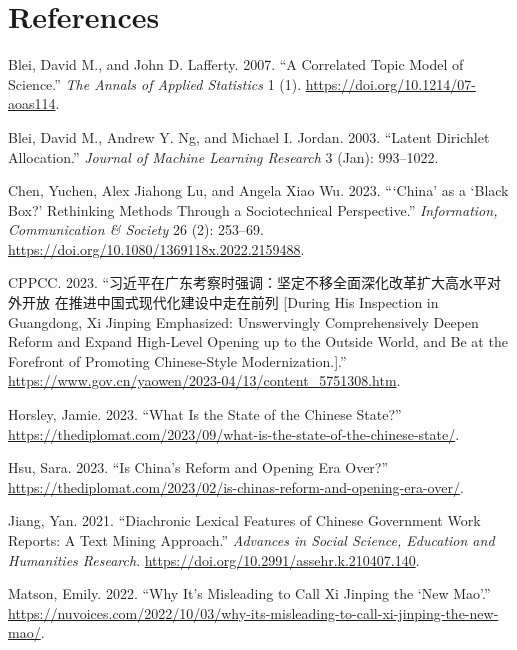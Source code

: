 \documentclass[
  letterpaper,
  abstract=true]{scrartcl}
\newlength{\cslhangindent}
\newenvironment{CSLReferences}[2] %
 {\begin{list}{}{%
  \setlength{\itemindent}{0pt}
  \setlength{\leftmargin}{0pt}
  \setlength{\parsep}{0pt}
  \ifodd #1
   \setlength{\leftmargin}{\cslhangindent}
   \setlength{\itemindent}{-1\cslhangindent}
  \fi
  \setlength{\itemsep}{#2\baselineskip}}}
 {\end{list}}
\begin{document}
\section*{References}\label{references}

\label{refs}
\begin{CSLReferences}{1}{0}
Blei, David M., and John D. Lafferty. 2007. {``A Correlated Topic Model
of Science.''} \emph{The Annals of Applied Statistics} 1 (1).
\url{https://doi.org/10.1214/07-aoas114}.

Blei, David M., Andrew Y. Ng, and Michael I. Jordan. 2003. {``Latent
Dirichlet Allocation.''} \emph{Journal of Machine Learning Research} 3
(Jan): 993--1022.

Chen, Yuchen, Alex Jiahong Lu, and Angela Xiao Wu. 2023. {``{`}China{'}
as a {`}Black Box?{'} Rethinking Methods Through a Sociotechnical
Perspective.''} \emph{Information, Communication \& Society} 26 (2):
253--69. \url{https://doi.org/10.1080/1369118x.2022.2159488}.

CPPCC. 2023.
{``习近平在广东考察时强调：坚定不移全面深化改革扩大高水平对外开放
在推进中国式现代化建设中走在前列 {[}During His Inspection in Guangdong,
Xi Jinping Emphasized: Unswervingly Comprehensively Deepen Reform and
Expand High-Level Opening up to the Outside World, and Be at the
Forefront of Promoting Chinese-Style Modernization.{]}.''}
\url{https://www.gov.cn/yaowen/2023-04/13/content_5751308.htm}.

Horsley, Jamie. 2023. {``What {Is} the {State} of the {Chinese}
{State}?''}
\url{https://thediplomat.com/2023/09/what-is-the-state-of-the-chinese-state/}.

Hsu, Sara. 2023. {``Is {China}'s {Reform} and {Opening} {Era} {Over}?''}
\url{https://thediplomat.com/2023/02/is-chinas-reform-and-opening-era-over/}.

Jiang, Yan. 2021. {``Diachronic Lexical Features of Chinese Government
Work Reports: A Text Mining Approach.''} \emph{Advances in Social
Science, Education and Humanities Research}.
\url{https://doi.org/10.2991/assehr.k.210407.140}.

Matson, Emily. 2022. {``Why It's Misleading to Call {Xi} {Jinping} the
{`New {Mao}'}.''}
\url{https://nuvoices.com/2022/10/03/why-its-misleading-to-call-xi-jinping-the-new-mao/}.


\end{CSLReferences}
\end{document}
